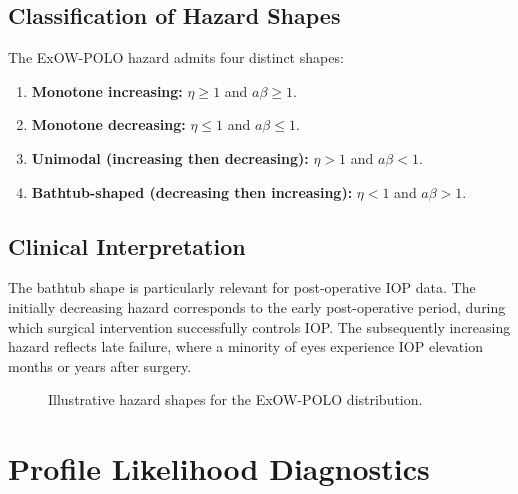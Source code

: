 \documentclass[12pt,a4paper]{article}
\begin{document}
\subsection{Classification of Hazard Shapes}

The ExOW-POLO hazard admits four distinct shapes:

\begin{enumerate}
\item \textbf{Monotone increasing:} $\eta \geq 1$ and $a\beta \geq 1$.
\item \textbf{Monotone decreasing:} $\eta \leq 1$ and $a\beta \leq 1$.
\item \textbf{Unimodal (increasing then decreasing):} $\eta > 1$ and $a\beta < 1$.
\item \textbf{Bathtub-shaped (decreasing then increasing):} $\eta < 1$ and $a\beta > 1$.
\end{enumerate}

\subsection{Clinical Interpretation}

The bathtub shape is particularly relevant for post-operative IOP data. The initially decreasing hazard corresponds to the early post-operative period, during which surgical intervention successfully controls IOP. The subsequently increasing hazard reflects late failure, where a minority of eyes experience IOP elevation months or years after surgery.

\begin{figure}[H]
\centering
{}
\caption{Illustrative hazard shapes for the ExOW-POLO distribution.}
\label{fig:S2}
\end{figure}

\section{Profile Likelihood Diagnostics}
\end{document}

